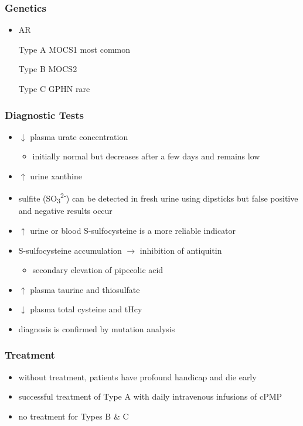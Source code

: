 \documentclass[12pt]{scrartcl}
\begin{document}
\begin{center}
\begin{center}
\subsubsection{Genetics}
\label{sec:org0bc349b}
\begin{itemize}
\item AR
\item[{Type A}] MOCS1 most common
\item[{Type B}] MOCS2
\item[{Type C}] GPHN rare
\end{itemize}

\subsubsection{Diagnostic Tests}
\label{sec:org3518269}
\begin{itemize}
\item \(\downarrow\) plasma urate concentration
\begin{itemize}
\item initially normal but decreases after a few days and remains low
\end{itemize}
\item \(\uparrow\) urine xanthine
\item sulfite (SO\textsubscript{3}\textsuperscript{2-}) can be detected in fresh urine using dipsticks but false
positive and negative results occur
\item \(\uparrow\) urine or blood S-sulfocysteine is a more reliable indicator
\end{itemize}


\begin{itemize}
\item S-sulfocysteine accumulation \(\to\) inhibition of antiquitin
\begin{itemize}
\item secondary elevation of pipecolic acid
\end{itemize}
\end{itemize}
\begin{itemize}
\item \(\uparrow\) plasma taurine and thiosulfate
\item \(\downarrow\) plasma total cysteine and tHcy
\item diagnosis is confirmed by mutation analysis
\end{itemize}

\subsubsection{Treatment}
\label{sec:orga7dfa6d}
\begin{itemize}
\item without treatment, patients have profound handicap and die early
\item successful treatment of Type A with daily intravenous infusions of
cPMP
\item no treatment for Types B \& C
\end{itemize}


\end{center}
\end{center}
\end{document}
